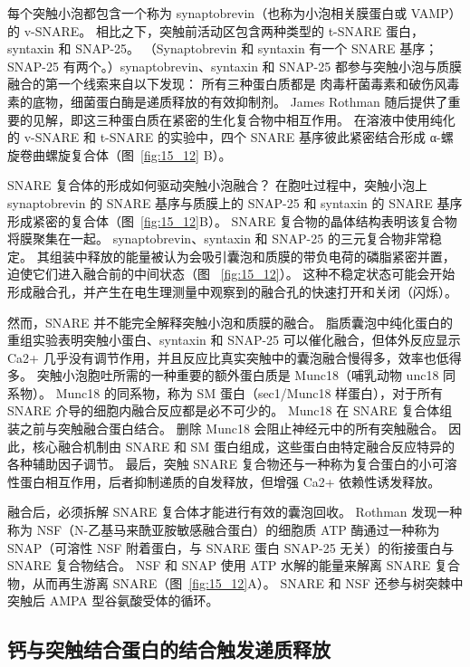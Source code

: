每个突触小泡都包含一个称为 synaptobrevin（也称为小泡相关膜蛋白或 VAMP）的 v-SNARE。
相比之下，突触前活动区包含两种类型的 t-SNARE 蛋白，syntaxin 和 SNAP-25。
（Synaptobrevin 和 syntaxin 有一个 SNARE 基序；SNAP-25 有两个。）synaptobrevin、syntaxin 和 SNAP-25 都参与突触小泡与质膜融合的第一个线索来自以下发现：
所有三种蛋白质都是 肉毒杆菌毒素和破伤风毒素的底物，细菌蛋白酶是递质释放的有效抑制剂。
James Rothman 随后提供了重要的见解，即这三种蛋白质在紧密的生化复合物中相互作用。
在溶液中使用纯化的 v-SNARE 和 t-SNARE 的实验中，四个 SNARE 基序彼此紧密结合形成 α-螺旋卷曲螺旋复合体（图~\ref{fig:15_12} B）。


SNARE 复合体的形成如何驱动突触小泡融合？
在胞吐过程中，突触小泡上 synaptobrevin 的 SNARE 基序与质膜上的 SNAP-25 和 syntaxin 的 SNARE 基序形成紧密的复合体（图~\ref{fig:15_12}B）。
SNARE 复合物的晶体结构表明该复合物将膜聚集在一起。 synaptobrevin、syntaxin 和 SNAP-25 的三元复合物非常稳定。
其组装中释放的能量被认为会吸引囊泡和质膜的带负电荷的磷脂紧密并置，迫使它们进入融合前的中间状态（图 ~\ref{fig:15_12}）。
这种不稳定状态可能会开始形成融合孔，并产生在电生理测量中观察到的融合孔的快速打开和关闭（闪烁）。


然而，SNARE 并不能完全解释突触小泡和质膜的融合。 脂质囊泡中纯化蛋白的重组实验表明突触小蛋白、syntaxin 和 SNAP-25 可以催化融合，但体外反应显示 Ca2+ 几乎没有调节作用，并且反应比真实突触中的囊泡融合慢得多，效率也低得多。
突触小泡胞吐所需的一种重要的额外蛋白质是 Munc18（哺乳动物 unc18 同系物）。 
Munc18 的同系物，称为 SM 蛋白（sec1/Munc18 样蛋白），对于所有 SNARE 介导的细胞内融合反应都是必不可少的。
Munc18 在 SNARE 复合体组装之前与突触融合蛋白结合。
删除 Munc18 会阻止神经元中的所有突触融合。
因此，核心融合机制由 SNARE 和 SM 蛋白组成，这些蛋白由特定融合反应特异的各种辅助因子调节。
最后，突触 SNARE 复合物还与一种称为复合蛋白的小可溶性蛋白相互作用，后者抑制递质的自发释放，但增强 Ca2+ 依赖性诱发释放。


融合后，必须拆解 SNARE 复合体才能进行有效的囊泡回收。
Rothman 发现一种称为 NSF（N-乙基马来酰亚胺敏感融合蛋白）的细胞质 ATP 酶通过一种称为 SNAP（可溶性 NSF 附着蛋白，与 SNARE 蛋白 SNAP-25 无关）的衔接蛋白与 SNARE 复合物结合。
NSF 和 SNAP 使用 ATP 水解的能量来解离 SNARE 复合物，从而再生游离 SNARE（图~\ref{fig:15_12}A）。
SNARE 和 NSF 还参与树突棘中突触后 AMPA 型谷氨酸受体的循环。



\subsection{钙与突触结合蛋白的结合触发递质释放}

